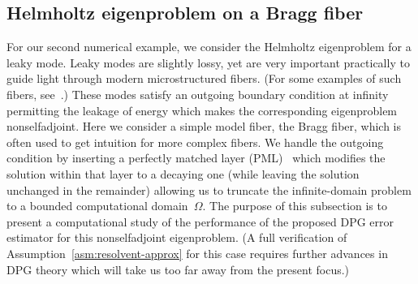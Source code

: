 \documentclass[12pt, oneside, reqno]{amsart}
\theoremstyle{remark}
\begin{document}
\subsection{Helmholtz eigenproblem on a Bragg fiber}

For our second numerical example, we consider the Helmholtz
eigenproblem for a leaky mode. Leaky modes are slightly lossy, yet are
very important practically to guide light through modern
microstructured fibers.  (For some examples of such fibers, see~\cite{GopGroPinVan2025-1}.)  These modes satisfy an outgoing
boundary condition at infinity permitting the leakage of energy which
makes the corresponding eigenproblem nonselfadjoint. Here we consider
a simple model fiber, the Bragg fiber, which is often used to get
intuition for more complex fibers. We handle the outgoing condition by
inserting a perfectly matched layer (PML)~\cite{Ber1994-1,
  ColMon1998-1, BraPas2007-1} which modifies the solution within that layer to a
decaying one (while leaving the solution unchanged in the remainder) allowing us to truncate the infinite-domain problem to a bounded
computational domain~$\Omega$. The purpose of this subsection is to present a
computational study of the performance of the proposed DPG error
estimator for this nonselfadjoint eigenproblem.  (A full verification
of Assumption~\ref{asm:resolvent-approx} for this case requires
further advances in DPG theory which will take us too far away from
the present focus.)
\end{document}
